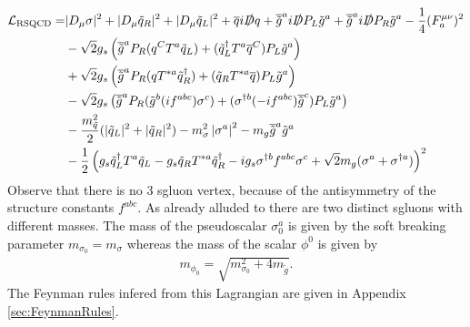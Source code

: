 \begin{align}
\mathcal{L}_{\mathrm{RSQCD}} = & |D_\mu \sigma|^2 + |D_\mu \tilde{q}_R|^2 + |D_\mu \tilde{q}_L|^2 + \overline{q}i\slashed{D}q + \overline{\tilde{g}}^ai\slashed{D}P_L\tilde{g}^a + \overline{\tilde{g}}^ai\slashed{D}P_R\tilde{g}^a - \frac{1}{4} (F_a^{\mu\nu})^2\nonumber\\
& -\sqrt{2}g_s \left( \overline{\tilde{g}}^a P_R (q^C T^a \tilde{q}_L) + (\tilde{q}_L^\dagger T^a \overline{q}^C)P_L\tilde{g}^a \right)\nonumber\\
& +\sqrt{2}g_s \left( \overline{\tilde{g}}^a P_R (q T^{\ast a} \tilde{q}_R^\dagger) + (\tilde{q}_R T^{\ast a} \overline{q})P_L\tilde{g}^a \right) \nonumber\\
& -\sqrt{2}g_s \left( \overline{\tilde{g}}^a P_R (\tilde{g}^b (if^{abc}) \sigma^c) + (\sigma^{\dagger b} (-if^{abc}) \overline{\tilde{g}}^c)P_L\tilde{g}^a \right) \nonumber\\
& -\frac{m_{\tilde{q}}^2}{2}(|\tilde{q}_L|^2 + |\tilde{q}_R|^2) -m_{\sigma}^2\left|\sigma^a\right|^2  - m_g \overline{\tilde{g}}^a\tilde{g}^a\nonumber\\
& -\frac{1}{2}\left( g_s \tilde{q}_L^\dagger T^a \tilde{q}_L - g_s \tilde{q}_R T^{\ast a} \tilde{q}_R^\dagger - ig_s\sigma^{\dagger b}f^{abc}\sigma^c + \sqrt{2}m_g(\sigma^a + \sigma^{\dagger a}) \right)^2\label{eq:L_RSQCD}
\end{align}
Observe that there is no 3 sgluon vertex, because of the antisymmetry of the structure constants $f^{abc}$. As already alluded to there are two distinct sgluons with different masses. The mass of the pseudoscalar $\sigma_0^a$ is given by the soft breaking parameter $m_{\sigma_0} = m_\sigma$ whereas the mass of the scalar $\phi^0$ is given by 
\begin{align}
m_{\phi_0} = \sqrt{m_{\sigma_0}^2 + 4 m_{\tilde{g}}}.
\end{align}
The Feynman rules infered from this Lagrangian are given in Appendix \ref{sec:FeynmanRules}.
\newpage
